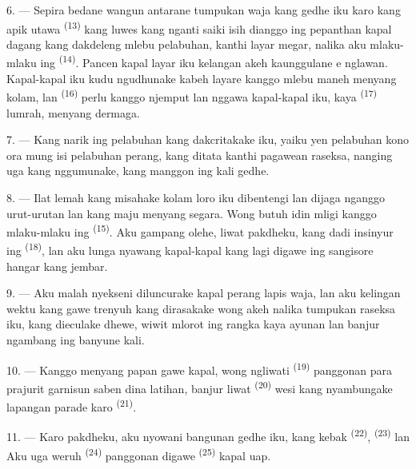 6. --- Sepira bedane wangun antarane tumpukan waja kang gedhe iku karo
 kang apik utawa 
\textsuperscript{(13)} kang luwes kang nganti saiki isih dianggo ing
pepanthan kapal dagang kang dakdeleng mlebu pelabuhan, kanthi layar
megar, nalika aku mlaku-mlaku ing 
\textsuperscript{(14)}. Pancen kapal layar iku kelangan akeh kaunggulane
 e nglawan. Kapal-kapal iku kudu ngudhunake
kabeh layare kanggo mlebu maneh menyang kolam, lan  \textsuperscript{(16)} perlu kanggo njemput lan nggawa
kapal-kapal iku, kaya  \textsuperscript{(17)}
lumrah, menyang dermaga.

\VUsaut{3.0mm}
\VUsaut{3.0mm}

7. --- Kang narik ing pelabuhan kang dakcritakake iku, yaiku yen
pelabuhan kono ora mung isi pelabuhan perang, kang ditata kanthi
pagawean raseksa, nanging uga  kang
nggumunake, kang manggon ing  kali gedhe.

8. --- Ilat lemah kang misahake kolam loro iku dibentengi lan dijaga
nganggo urut-urutan  lan  kang
maju menyang segara. Wong butuh idin mligi kanggo mlaku-mlaku ing
 \textsuperscript{(15)}. Aku gampang olehe, liwat
pakdheku, kang dadi insinyur ing 
\textsuperscript{(18)}, lan aku lunga nyawang kapal-kapal kang lagi
digawe ing sangisore hangar kang jembar.

9. --- Aku malah nyekseni diluncurake kapal perang lapis waja, lan aku
kelingan wektu kang gawe trenyuh kang dirasakake wong akeh nalika
tumpukan raseksa iku, kang dieculake dhewe, wiwit mlorot ing rangka
kaya ayunan lan banjur ngambang ing banyune kali.

10. --- Kanggo menyang papan gawe kapal, wong ngliwati  \textsuperscript{(19)} panggonan para prajurit garnisun saben
dina latihan, banjur liwat  \textsuperscript{(20)}
wesi kang nyambungake lapangan parade karo 
\textsuperscript{(21)}.

\VUsaut{3.0mm}
\VUsaut{3.0mm}

11. --- Karo pakdheku, aku nyowani bangunan gedhe iku, kang kebak
 \textsuperscript{(22)}, 
\textsuperscript{(23)} lan  Aku uga weruh  \textsuperscript{(24)} panggonan digawe 
\textsuperscript{(25)} kapal uap.

